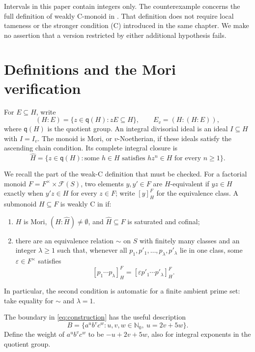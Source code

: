 \documentclass[11pt]{article}
\theoremstyle{definition}
\newcommand{\F}{\mathcal F}
\newcommand{\q}{\mathsf q}
\newcommand{\NN}{\mathbb N_0}
\begin{document}
Intervals in this paper contain integers only. The counterexample concerns the full definition of weakly C-monoid in \cite[Definition 5.1]{K}. That definition does not require local tameness or the stronger condition (C) introduced in the same chapter. We make no assertion that a version restricted by either additional hypothesis fails.

\section{Definitions and the Mori verification}

For $E\subseteq H$, write
\[
 (H:E)=\{z\in\q(H):zE\subseteq H\},\qquad E_v=(H:(H:E)),
\]
where $\q(H)$ is the quotient group. An integral divisorial ideal is an ideal $I\subseteq H$ with $I=I_v$. The monoid is Mori, or $v$-Noetherian, if these ideals satisfy the ascending chain condition. Its complete integral closure is
\[
 \widehat H=\{z\in\q(H):\text{some }h\in H\text{ satisfies }hz^n\in H
                 \text{ for every }n\geq1\}.
\]

We recall the part of the weak-C definition that must be checked. For a factorial monoid $F=F^\times\times\F(S)$, two elements $y,y'\in F$ are $H$-equivalent if $yz\in H$ exactly when $y'z\in H$ for every $z\in F$; write $[y]^F_H$ for the equivalence class. A submonoid $H\subseteq F$ is weakly C in \cite[Definition 5.1]{K} if:
\begin{enumerate}
\item $H$ is Mori, $(H:\widehat H)\neq\emptyset$, and $\widehat H\subseteq F$ is saturated and cofinal;
\item there are an equivalence relation $\sim$ on $S$ with finitely many classes and an integer $\lambda\geq1$ such that, whenever all $p_1,p'_1,\ldots,p_\lambda,p'_\lambda$ lie in one class, some $\varepsilon\in F^\times$ satisfies
\[
 [p_1\cdots p_\lambda]^F_H=[\varepsilon p'_1\cdots p'_\lambda]^F_H.
\]
\end{enumerate}
In particular, the second condition is automatic for a finite ambient prime set: take equality for $\sim$ and $\lambda=1$.

The boundary in \eqref{eq:construction} has the useful description
\begin{equation}\label{eq:boundary}
 B=\{a^ub^vc^w:u,v,w\in\NN,\ u=2v+5w\}.
\end{equation}
Define the weight of $a^ub^vc^w$ to be $-u+2v+5w$, also for integral exponents in the quotient group.
\end{document}
